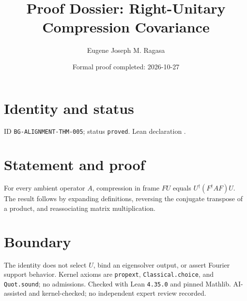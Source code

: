 \documentclass[11pt]{article}
\title{Proof Dossier: Right-Unitary Compression Covariance}\author{Eugene Joseph M. Ragasa}\date{Formal proof completed: 2026-10-27}
\begin{document}
\maketitle
\section{Identity and status}
ID \texttt{BG-ALIGNMENT-THM-005}; status \texttt{proved}. Lean declaration .
\section{Statement and proof}
For every ambient operator $A$, compression in frame $FU$ equals $U^\dagger(F^\dagger A F)U$. The result follows by expanding definitions, reversing the conjugate transpose of a product, and reassociating matrix multiplication.
\section{Boundary}
The identity does not select $U$, bind an eigensolver output, or assert Fourier support behavior. Kernel axioms are \texttt{propext}, \texttt{Classical.choice}, and \texttt{Quot.sound}; no admissions. Checked with Lean \texttt{4.35.0} and pinned Mathlib. AI-assisted and kernel-checked; no independent expert review recorded.
\end{document}
